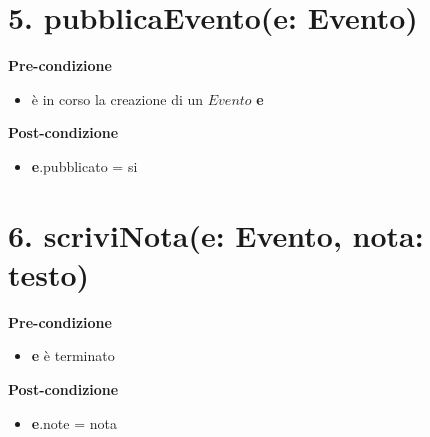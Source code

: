\documentclass[12pt]{extarticle}
\begin{document}
\section*{5. pubblicaEvento(e: Evento)}
\textbf{Pre-condizione}
\begin{itemize}
  \item è in corso la creazione di un $Evento$ \textbf{e}
\end{itemize}
\textbf{Post-condizione}
\begin{itemize}
    \item \textbf{e}.pubblicato = si
\end{itemize}

\section*{6. scriviNota(e: Evento, nota: testo)}

\textbf{Pre-condizione}
\begin{itemize}
  \item \textbf{e} è terminato
\end{itemize}
\textbf{Post-condizione}
\begin{itemize}
  \item \textbf{e}.note = nota
\end{itemize}
\end{document}

